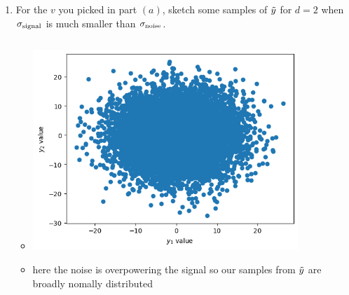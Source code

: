 \documentclass[12pt,twoside]{article}
\begin{document}
\begin{enumerate}
\begin{enumerate}
\item For the $v$ you picked in part $(a)$, sketch some samples of $\tilde{  y }$ for $d=2$ when $\sigma_{\operatorname{signal}}$ is much smaller than $\sigma_{\operatorname{noise}}$.  
\begin{itemize}
    \color{blue}
    \item \inputminted[firstline=85, lastline=98, breaklines=True]{python}{hw8.py}
    \includegraphics[width=10cm]{homework/homework_8/images/h8_3.png}
    \item here the noise is overpowering the signal so our samples from $\Tilde{y}$ are broadly nomally distributed 
\end{itemize}


\end{enumerate}
\end{enumerate}
\end{document}
